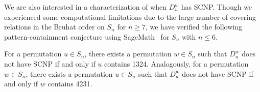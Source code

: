 We are also interested in a characterization of when $D_u^w$ has SCNP. Though we experienced some computational limitations due to the large number of covering relations in the Bruhat order on $S_n$ for $n \ge 7$, we have verified the following pattern-containment conjecture using SageMath~\cite{sagemath} for $S_n$ with $n\le 6$.
\begin{conjecture}
    For a permutation $u\in S_n$, there exists a permutation $w\in S_n$ such that $D_{u}^w$ does not have SCNP if and only if $u$ contains 1324. Analogously, for a permutation $w\in S_n$, there exists a permutation $u\in S_n$ such that $D_{u}^w$ does not have SCNP if and only if $w$ contains 4231. 
\end{conjecture}
